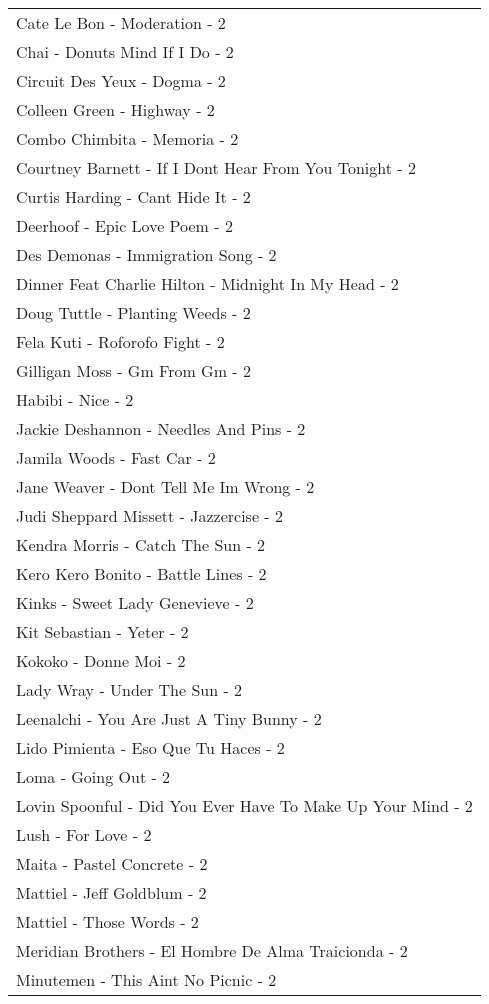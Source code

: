 \documentclass[
]{article}
\begin{document}
\begin{longtable}{l}
Cate Le Bon - Moderation - 2 \\ 
Chai - Donuts Mind If I Do - 2 \\ 
Circuit Des Yeux - Dogma - 2 \\ 
Colleen Green - Highway - 2 \\ 
Combo Chimbita - Memoria - 2 \\ 
Courtney Barnett - If I Dont Hear From You Tonight - 2 \\ 
Curtis Harding - Cant Hide It - 2 \\ 
Deerhoof - Epic Love Poem - 2 \\ 
Des Demonas - Immigration Song - 2 \\ 
Dinner Feat Charlie Hilton - Midnight In My Head - 2 \\ 
Doug Tuttle - Planting Weeds - 2 \\ 
Fela Kuti - Roforofo Fight - 2 \\ 
Gilligan Moss - Gm From Gm - 2 \\ 
Habibi - Nice - 2 \\ 
Jackie Deshannon - Needles And Pins - 2 \\ 
Jamila Woods - Fast Car - 2 \\ 
Jane Weaver - Dont Tell Me Im Wrong - 2 \\ 
Judi Sheppard Missett - Jazzercise - 2 \\ 
Kendra Morris - Catch The Sun - 2 \\ 
Kero Kero Bonito - Battle Lines - 2 \\ 
Kinks - Sweet Lady Genevieve - 2 \\ 
Kit Sebastian - Yeter - 2 \\ 
Kokoko - Donne Moi - 2 \\ 
Lady Wray - Under The Sun - 2 \\ 
Leenalchi - You Are Just A Tiny Bunny - 2 \\ 
Lido Pimienta - Eso Que Tu Haces - 2 \\ 
Loma - Going Out - 2 \\ 
Lovin Spoonful - Did You Ever Have To Make Up Your Mind - 2 \\ 
Lush - For Love - 2 \\ 
Maita - Pastel Concrete - 2 \\ 
Mattiel - Jeff Goldblum - 2 \\ 
Mattiel - Those Words - 2 \\ 
Meridian Brothers - El Hombre De Alma Traicionda - 2 \\ 
Minutemen - This Aint No Picnic - 2 \\ 

\end{longtable}
\end{document}

